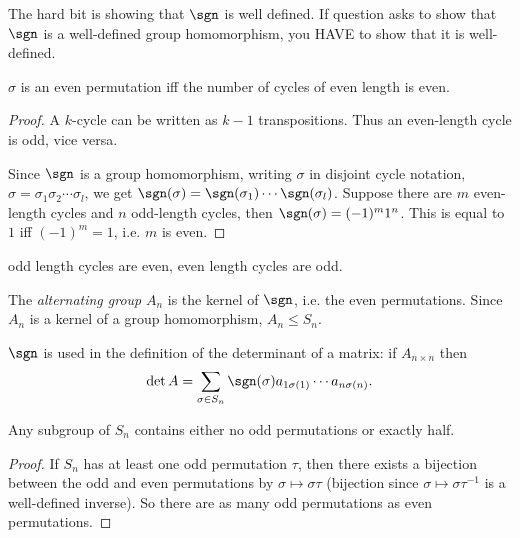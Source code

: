 \documentclass[a4paper]{article}
\begin{document}
  \note The hard bit is showing that $\sgn$ is well defined. If question asks to show that $\sgn$ is a well-defined group homomorphism, you HAVE to show that it is well-defined.

  \begin{lemma}
    $\sigma$ is an even permutation iff the number of cycles of even length is even.
  \end{lemma}

  \begin{proof}
    A $k$-cycle can be written as $k - 1$ transpositions. Thus an even-length cycle is odd, vice versa.

    Since $\sgn$ is a group homomorphism, writing $\sigma$ in disjoint cycle notation, $\sigma = \sigma_1\sigma_2\cdots\sigma_l$, we get $\sgn(\sigma) = \sgn(\sigma_1)\cdots \sgn(\sigma_l)$. Suppose there are $m$ even-length cycles and $n$ odd-length cycles, then $\sgn(\sigma) = (-1)^m 1^n$. This is equal to $1$ iff $(-1)^m = 1$, i.e. $m$ is even. 
  \end{proof}
  \note odd length cycles are even, even length cycles are odd.

  \begin{defi}
    The \emph{alternating group} $A_n$ is the kernel of $\sgn$, i.e. the even permutations.
    Since $A_n$ is a kernel of a group homomorphism, $A_n \leq S_n$.
  \end{defi}
  \note $\sgn$ is used in the definition of the determinant of a matrix: if $A_{n\times n}$ then
  \[
    \det A = \sum_{\sigma\in S_n}\sgn(\sigma) a_{1\sigma(1)}\cdots a_{n\sigma(n)}.
  \]

  \begin{prop}
    Any subgroup of $S_n$ contains either no odd permutations or exactly half.
  \end{prop}

  \begin{proof}
    If $S_n$ has at least one odd permutation $\tau$, then there exists a bijection between the odd and even permutations by $\sigma \mapsto \sigma\tau$ (bijection since $\sigma \mapsto \sigma \tau^{-1}$ is a well-defined inverse). So there are as many odd permutations as even permutations. 
  \end{proof}
\end{document}

